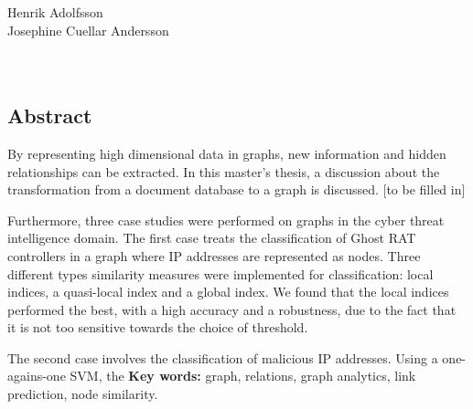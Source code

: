 
\noindent
\thesistitle\\
\thesissubtitle\\
\whatthisis\\
\\
\large{%
    Henrik Adolfsson\\
	Josephine Cuellar Andersson\\
}\\
\\
\large{%
	\whereandwhen
}

\vspace*{\fill}
\begin{center}
    \section*{Abstract}
\end{center}
By representing high dimensional data in graphs, new information and hidden relationships can be extracted. In this master's thesis, a discussion about the transformation from a document database to a graph is discussed. [to be filled in] 

Furthermore, three case studies were performed on graphs in the cyber threat intelligence domain. The first case treats the classification of Ghost RAT controllers in a graph where IP addresses are represented as nodes. Three different types similarity measures were implemented for classification: local indices, a quasi-local index and a global index. We found that the local indices performed the best, with a high accuracy and a robustness, due to the fact that it is not too sensitive towards the choice of threshold. 

The second case involves the classification of malicious IP addresses. Using a one-agains-one SVM, the 
\newline
\noindent
\textbf{Key words:} graph, relations, graph analytics, link prediction, node similarity.
